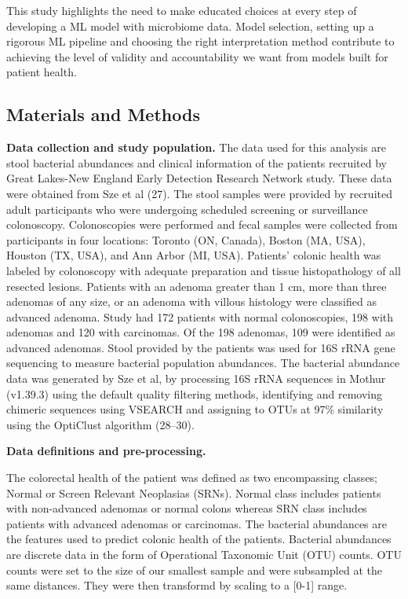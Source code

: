\documentclass[11pt,]{article}
\begin{document}
This study highlights the need to make educated choices at every step of
developing a ML model with microbiome data. Model selection, setting up
a rigorous ML pipeline and choosing the right interpretation method
contribute to achieving the level of validity and accountability we want
from models built for patient health.

\subsection{Materials and Methods}\label{materials-and-methods}

\textbf{Data collection and study population.} The data used for this
analysis are stool bacterial abundances and clinical information of the
patients recruited by Great Lakes-New England Early Detection Research
Network study. These data were obtained from Sze et al (27). The stool
samples were provided by recruited adult participants who were
undergoing scheduled screening or surveillance colonoscopy.
Colonoscopies were performed and fecal samples were collected from
participants in four locations: Toronto (ON, Canada), Boston (MA, USA),
Houston (TX, USA), and Ann Arbor (MI, USA). Patients' colonic health was
labeled by colonoscopy with adequate preparation and tissue
histopathology of all resected lesions. Patients with an adenoma greater
than 1 cm, more than three adenomas of any size, or an adenoma with
villous histology were classified as advanced adenoma. Study had 172
patients with normal colonoscopies, 198 with adenomas and 120 with
carcinomas. Of the 198 adenomas, 109 were identified as advanced
adenomas. Stool provided by the patients was used for 16S rRNA gene
sequencing to measure bacterial population abundances. The bacterial
abundance data was generated by Sze et al, by processing 16S rRNA
sequences in Mothur (v1.39.3) using the default quality filtering
methods, identifying and removing chimeric sequences using VSEARCH and
assigning to OTUs at 97\% similarity using the OptiClust algorithm
(28--30).

\textbf{Data definitions and pre-processing.}

The colorectal health of the patient was defined as two encompassing
classes; Normal or Screen Relevant Neoplasias (SRNs). Normal class
includes patients with non-advanced adenomas or normal colons whereas
SRN class includes patients with advanced adenomas or carcinomas. The
bacterial abundances are the features used to predict colonic health of
the patients. Bacterial abundances are discrete data in the form of
Operational Taxonomic Unit (OTU) counts. OTU counts were set to the size
of our smallest sample and were subsampled at the same distances. They
were then transformd by scaling to a {[}0-1{]} range.
\end{document}
